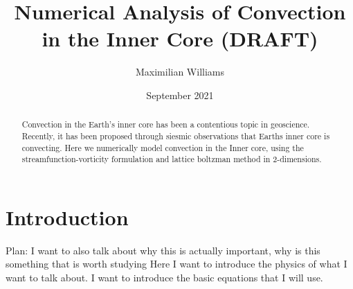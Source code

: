 \documentclass{article}
\title{Numerical Analysis of Convection in the Inner Core (DRAFT)}
\author{Maximilian Williams}
\date{September 2021}
\begin{document}
\maketitle

\begin{abstract}
	Convection in the Earth's inner core has been a contentious topic in geoscience. Recently, it has been proposed through siesmic observations that Earths inner core is convecting. Here we numerically model convection in the Inner core, using the streamfunction-vorticity formulation and lattice boltzman method in 2-dimensions. 
	
 
\end{abstract}

\section*{Introduction}
Plan:
I want to also talk about why this is actually important, why is this something that is worth studying
\newline
Here I want to introduce the physics of what I want to talk about. I want to introduce 
the basic equations that I will use.
\newline
\end{document}
